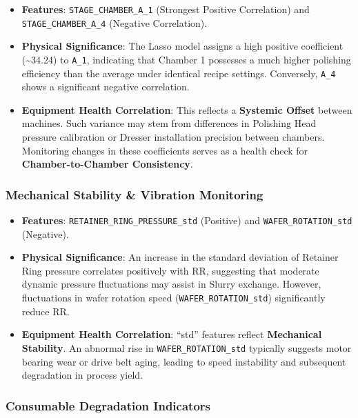 \documentclass[11pt]{article}
\providecommand{\tightlist}{%
      \setlength{\itemsep}{0pt}\setlength{\parskip}{0pt}}
\begin{document}
\begin{itemize}
\tightlist
\item
  \textbf{Features}: \texttt{STAGE\_CHAMBER\_A\_1} (Strongest Positive
  Correlation) and \texttt{STAGE\_CHAMBER\_A\_4} (Negative Correlation).
\item
  \textbf{Physical Significance}: The Lasso model assigns a high
  positive coefficient (\textasciitilde34.24) to \texttt{A\_1},
  indicating that Chamber 1 possesses a much higher polishing efficiency
  than the average under identical recipe settings. Conversely,
  \texttt{A\_4} shows a significant negative correlation.
\item
  \textbf{Equipment Health Correlation}: This reflects a
  \textbf{Systemic Offset} between machines. Such variance may stem from
  differences in Polishing Head pressure calibration or Dresser
  installation precision between chambers. Monitoring changes in these
  coefficients serves as a health check for \textbf{Chamber-to-Chamber
  Consistency}.
\end{itemize}

\subsubsection{Mechanical Stability \& Vibration
Monitoring}\label{mechanical-stability-vibration-monitoring}

\begin{itemize}
\tightlist
\item
  \textbf{Features}: \texttt{RETAINER\_RING\_PRESSURE\_std} (Positive)
  and \texttt{WAFER\_ROTATION\_std} (Negative).
\item
  \textbf{Physical Significance}: An increase in the standard deviation
  of Retainer Ring pressure correlates positively with RR, suggesting
  that moderate dynamic pressure fluctuations may assist in Slurry
  exchange. However, fluctuations in wafer rotation speed
  (\texttt{WAFER\_ROTATION\_std}) significantly reduce RR.
\item
  \textbf{Equipment Health Correlation}: ``std'' features reflect
  \textbf{Mechanical Stability}. An abnormal rise in
  \texttt{WAFER\_ROTATION\_std} typically suggests motor bearing wear or
  drive belt aging, leading to speed instability and subsequent
  degradation in process yield.
\end{itemize}

\subsubsection{Consumable Degradation
Indicators}\label{consumable-degradation-indicators}
\end{document}
